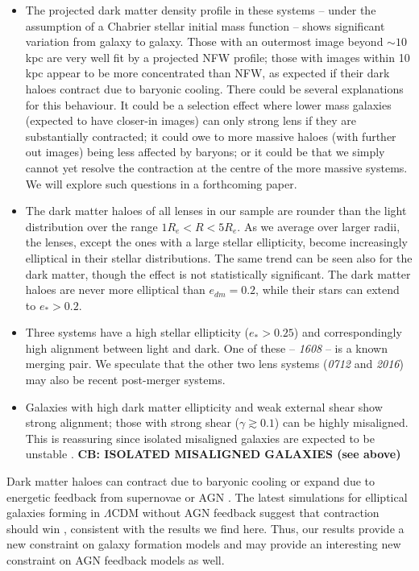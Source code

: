 \documentclass[useAMS,usenatbib]{mn2e}
\begin{document}
\begin{itemize}
\item The projected dark matter density profile in these systems -- under the assumption of a Chabrier stellar initial mass function -- shows significant variation from galaxy to galaxy. Those with an outermost image beyond $\sim 10$\,kpc are very well fit by a projected NFW profile; those with images within 10\,kpc appear to be more concentrated than NFW, as expected if their dark haloes contract due to baryonic cooling. There could be several explanations for this behaviour. It could be a selection effect where lower mass galaxies (expected to have closer-in images) can only strong lens if they are substantially contracted; it could owe to more massive haloes (with further out images) being less affected by baryons; or it could be that we simply cannot yet resolve the contraction at the centre of the more massive systems. We will explore such questions in a forthcoming paper.

\item The dark matter haloes of all lenses in our sample are rounder than the light distribution over the range $1R_e < R < 5R_e$. As we average over larger radii, the lenses, except the ones with a large stellar ellipticity, become increasingly elliptical in their stellar distributions. The same trend can be seen also for the dark matter, though the effect is not statistically significant. The dark matter haloes are never more elliptical than $e_{dm} = 0.2$, while their stars can extend to $e_* > 0.2$.

\item Three systems have a high stellar ellipticity ($e_* > 0.25$) and correspondingly high alignment between light and dark. One of these -- {\it1608} -- is a known merging pair. We speculate that the other two lens systems ({\it0712} and {\it2016}) may also be recent post-merger systems. 

\item Galaxies with high dark matter ellipticity and weak external shear show strong alignment; those with strong shear ($\gamma \gtrsim 0.1$) can be highly misaligned. This is reassuring since isolated misaligned galaxies are expected to be unstable \citep[e.g.][]{1979ApJ...233..872H,1988A&A...206..269M,2007ApJ...670.1027A,2015arXiv150203429D}. \textbf{CB: ISOLATED MISALIGNED GALAXIES (see above)}

\end{itemize}

Dark matter haloes can contract due to baryonic cooling \citep[e.g.][]{1986ApJ...301...27B} or expand due to energetic feedback from supernovae \citep[e.g.][]{2005MNRAS.356..107R} or AGN \citep[e.g.][]{2012MNRAS.422.3081M}. The latest simulations for elliptical galaxies forming in $\Lambda$CDM without AGN feedback suggest that contraction should win \citep{2015MNRAS.453.2447D}, consistent with the results we find here. Thus, our results provide a new constraint on galaxy formation models and may provide an interesting new constraint on AGN feedback models as well.
\end{document}
